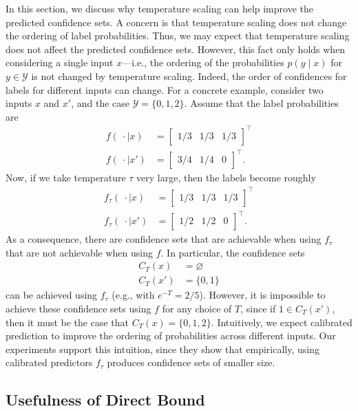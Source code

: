 \documentclass{article} \usepackage{iclr2020_conference,times}
\renewcommand{\(}						{\left(}
\renewcommand{\)}						{\right)}
\renewcommand{\[}						{\left[}
\renewcommand{\]}						{\right]}
\newcommand{\<}						{\left<}
\renewcommand{\>}						{\right>}
\begin{document}
In this section, we discuss why temperature scaling can help improve the predicted confidence sets. A concern is that temperature scaling does not change the ordering of label probabilities. Thus, we may expect that temperature scaling does not affect the predicted confidence sets. However, this fact only holds when considering a single input $x$---i.e., the ordering of the probabilities $p(y\mid x)$ for $y\in\mathcal{Y}$ is not changed by temperature scaling. Indeed, the order of confidences for labels for different inputs can change. For a concrete example, consider two inputs $x$ and $x'$, and the case $\mathcal{Y}=\{0,1,2\}$. Assume that the label probabilities are
\begin{align*}
f(~\cdot\mid x) &= \begin{bmatrix} 1/3 & 1/3 & 1/3 \end{bmatrix}^{\top} \\
f(~\cdot\mid x') &= \begin{bmatrix} 3/4 & 1/4 & 0 \end{bmatrix}^{\top}.
\end{align*}
Now, if we take temperature $\tau$ very large, then the labels become roughly
\begin{align*}
f_{\tau}(~\cdot\mid x) &= \begin{bmatrix} 1/3 & 1/3 & 1/3 \end{bmatrix}^{\top} \\
f_{\tau}(~\cdot\mid x') &= \begin{bmatrix} 1/2 & 1/2 & 0 \end{bmatrix}^{\top}.
\end{align*}
As a consequence, there are confidence sets that are achievable when using $f_{\tau}$ that are not achievable when using $f$. In particular, the confidence sets
\begin{align*}
C_T(x) &= \varnothing \\
C_T(x') &= \{0, 1\}
\end{align*}
can be achieved using $f_{\tau}$ (e.g., with $e^{-T} = 2/5$). However, it is impossible to achieve these confidence sets using $f$ for any choice of $T$, since if $1\in C_T(x')$, then it must be the case that $C_T(x)=\{0,1,2\}$. Intuitively, we expect calibrated prediction to improve the ordering of probabilities across different inputs. Our experiments support this intuition, since they show that empirically,  using calibrated predictors $f_{\tau}$ produces confidence sets of smaller size.

\subsection{Usefulness of Direct Bound}
\label{sec:appendixdirect}
\end{document}
